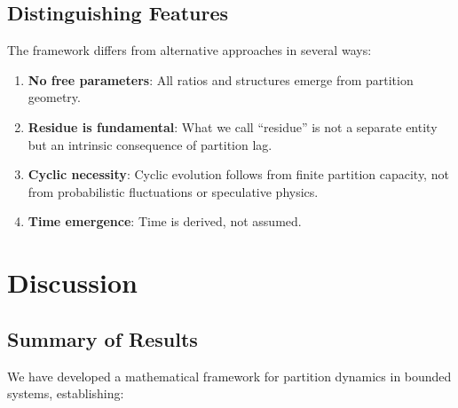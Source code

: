 \documentclass[twocolumn,10pt,a4paper]{article}
\theoremstyle{definition}
\theoremstyle{remark}
\begin{document}
\subsection{Distinguishing Features}

The framework differs from alternative approaches in several ways:

\begin{enumerate}
    \item \textbf{No free parameters}: All ratios and structures emerge from partition geometry.

    \item \textbf{Residue is fundamental}: What we call ``residue'' is not a separate entity but an intrinsic consequence of partition lag.

    \item \textbf{Cyclic necessity}: Cyclic evolution follows from finite partition capacity, not from probabilistic fluctuations or speculative physics.

    \item \textbf{Time emergence}: Time is derived, not assumed.
\end{enumerate}

\section{Discussion}
\label{sec:discussion}

\subsection{Summary of Results}

We have developed a mathematical framework for partition dynamics in bounded systems, establishing:
\end{document}
